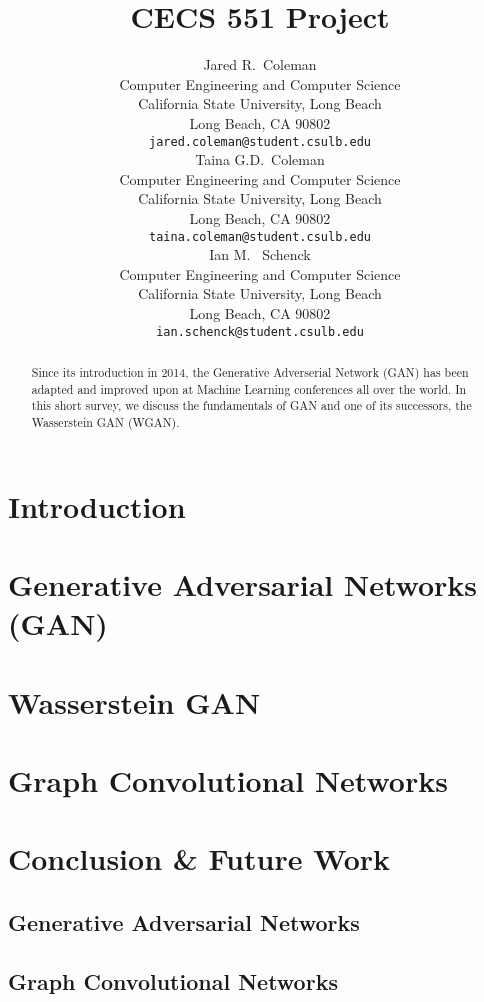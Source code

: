 \documentclass{article}
\title{CECS 551 Project}
\author{%
  Jared R.~Coleman\\
  Computer Engineering and Computer Science\\
  California State University, Long Beach\\
  Long Beach, CA 90802 \\
  \texttt{jared.coleman@student.csulb.edu} \\
  \And 
  Taina G.D.~Coleman\\
  Computer Engineering and Computer Science\\
  California State University, Long Beach\\
  Long Beach, CA 90802 \\
  \texttt{taina.coleman@student.csulb.edu} \\
  \And 
  Ian M. ~Schenck\\
  Computer Engineering and Computer Science\\
  California State University, Long Beach\\
  Long Beach, CA 90802 \\
  \texttt{ian.schenck@student.csulb.edu} \\
}
\begin{document}
\maketitle

\begin{abstract}
   Since its introduction in 2014, the Generative Adverserial Network (GAN) has been adapted and improved upon at Machine Learning conferences all over the world. In this short survey, we discuss the fundamentals of GAN and one of its successors, the Wasserstein GAN (WGAN).
\end{abstract}


\section{Introduction} 



\section{Generative Adversarial Networks (GAN)}



\section{Wasserstein GAN}



\section{Graph Convolutional Networks}



\section{Conclusion \& Future Work}

\subsection{Generative Adversarial Networks}

\subsection{Graph Convolutional Networks}



\end{document}
